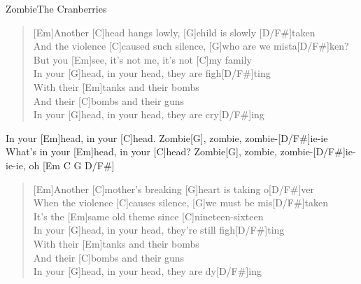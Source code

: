 \begin{song}{Zombie}{The Cranberries}

    \begin{intro}  
        [Em C G D/F#]
    \end{intro}  

    \begin{verse}  
        [Em]Another [C]head hangs lowly, [G]child is slowly [D/F#]taken \\
        [Em]And the violence [C]caused such silence, [G]who are we mista[D/F#]ken? \\
        But you [Em]see, it's not me, it's not [C]my family \\
        In your [G]head, in your head, they are figh[D/F#]ting \\
        With their [Em]tanks and their bombs \\
        And their [C]bombs and their guns \\
        In your [G]head, in your head, they are cry[D/F#]ing
    \end{verse}  

    \begin{chorus}
        In your [Em]head, in your [C]head. Zombie[G], zombie, zombie-[D/F#]ie-ie \\
        What's in your [Em]head, in your [C]head? Zombie[G], zombie, zombie-[D/F#]ie-ie-ie, oh \hspace{2em}[Em C G D/F#]
    \end{chorus}

    \begin{verse}  
        [Em]Another [C]mother's breaking [G]heart is taking o[D/F#]ver \\
        [Em]When the violence [C]causes silence, [G]we must be mis[D/F#]taken \\
        It's the [Em]same old theme since [C]nineteen-sixteen \\
        In your [G]head, in your head, they're still figh[D/F#]ting \\
        With their [Em]tanks and their bombs \\
        And their [C]bombs and their guns \\
        In your [G]head, in your head, they are dy[D/F#]ing
    \end{verse}  


    \begin{outro}  
        [Em C G D/F#]
    \end{outro}  

\end{song}
